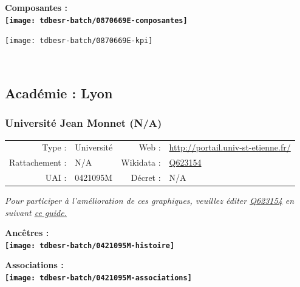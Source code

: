 \documentclass[12pt,french,]{article}
\begin{document}
\hrulefill

\begin{center} \bf Composantes : \\  
\texttt{[image: tdbesr-batch/0870669E-composantes]} \end{center}

\begin{center}\texttt{[image: tdbesr-batch/0870669E-kpi]} \end{center}\checkoddpage

\ifoddpage \fi ~\newpage  

\hypertarget{acaduxe9mie-lyon}{%
\subsection{Académie : Lyon}\label{acaduxe9mie-lyon}}

\hypertarget{universituxe9-jean-monnet-na}{%
\subsubsection{Université Jean Monnet
(N/A)}\label{universituxe9-jean-monnet-na}}

\begin{tabular*}{\textwidth}{rp{5cm}rl}  
\hline  
Type : & Université & Web : &\href{http://portail.univ-st-etienne.fr/}{http://portail.univ-st-etienne.fr/} \\  
Rattachement : & N/A & Wikidata : & \href{https://www.wikidata.org/entity/Q623154}{Q623154} \\  
UAI : & 0421095M & Décret : & N/A \\  
\hline  
\end{tabular*}

\textit{\scriptsize Pour participer à l'amélioration de ces graphiques, veuillez éditer  \href{https://www.wikidata.org/entity/Q623154}{Q623154}  en suivant \href{https://github.com/cpesr/wikidataESR/blob/master/Rmd/wikidataESR.md}{ce guide.}}

\vspace{1cm}  
\begin{minipage}[b]{0.50\textwidth}\begin{center} \bf Ancêtres : \\  
\texttt{[image: tdbesr-batch/0421095M-histoire]} \end{center}\end{minipage}\begin{minipage}[b]{0.50\textwidth}\begin{center} \bf Associations : \\  
\texttt{[image: tdbesr-batch/0421095M-associations]} \end{center}\end{minipage}
\end{document}
